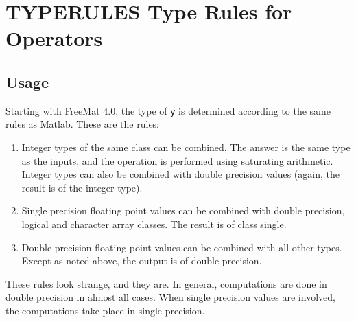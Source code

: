 \section{TYPERULES Type Rules for Operators}

\subsection{Usage}

Starting with FreeMat 4.0, the type of \verb|y| is determined according to the
same rules as Matlab.  These are the rules:
\begin{enumerate}
\item  Integer types of the same class can be combined.  The answer is
the same type as the inputs, and the operation is performed using 
saturating arithmetic.  Integer types can also be combined with double
precision values (again, the result is of the integer type).

\item  Single precision floating point values can be combined with double
precision, logical and character array classes.  The result is of 
class single.

\item  Double precision floating point values can be combined with all
other types.  Except as noted above, the output is of double precision.

\end{enumerate}
These rules look strange, and they are.   In general, computations are
done in double precision in almost all cases.  When single precision
values are involved, the computations take place in single precision.
